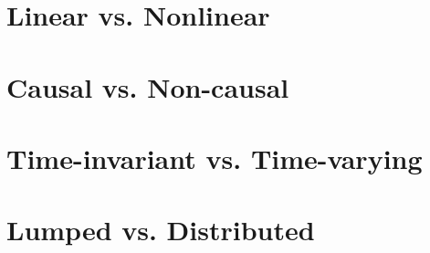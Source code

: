 \documentclass{beamer}
\begin{document}
\section{Linear vs. Nonlinear}

\begin{frame}
\frametitle{}
\end{frame}

\section{Causal vs. Non-causal} 

\begin{frame}
\frametitle{}
\end{frame}

\section{Time-invariant vs. Time-varying} 

\begin{frame}
\frametitle{}
\end{frame}

\section{Lumped vs. Distributed} 

\begin{frame}
\frametitle{}
\end{frame}

\end{document}
